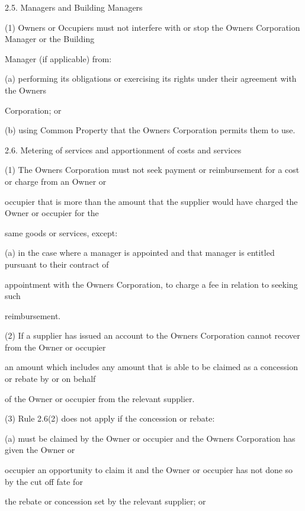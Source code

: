 \documentclass{article}
\begin{document}
{\fontsize{9.99}{1}2.5. Managers and Building Managers }

{\fontsize{9.962}{1}(1) Owners or Occupiers must not interfere with or stop the Owners Corporation Manager or the Building }

{\fontsize{10.02}{1}Manager (if applicable) from: }

{\fontsize{9.962}{1}(a) performing its obligations or exercising its rights under their agreement with the Owners }

{\fontsize{10.02}{1}Corporation; or }

{\fontsize{9.962}{1}(b) using Common Property that the Owners Corporation permits them to use. }

{\fontsize{9.99}{1}2.6. Metering of services and apportionment of costs and services }

{\fontsize{9.962}{1}(1) The Owners Corporation must not seek payment or reimbursement for a cost or charge from an Owner or }

{\fontsize{10.02}{1}occupier that is more than the amount that the supplier would have charged the Owner or occupier for the }

{\fontsize{10.02}{1}same goods or services, except: }

{\fontsize{9.962}{1}(a) in the case where a manager is appointed and that manager is entitled pursuant to their contract of }

{\fontsize{10.02}{1}appointment with the Owners Corporation, to charge a fee in relation to seeking such }

{\fontsize{10.02}{1}reimbursement. }

{\fontsize{9.962}{1}(2) If a supplier has issued an account to the Owners Corporation cannot recover from the Owner or occupier }

{\fontsize{10.02}{1}an amount which includes any amount that is able to be claimed as a concession or rebate by or on behalf }

{\fontsize{10.02}{1}of the Owner or occupier from the relevant supplier. }

{\fontsize{9.962}{1}(3) Rule 2.6(2) does not apply if the concession or rebate: }

{\fontsize{9.962}{1}(a) must be claimed by the Owner or occupier and the Owners Corporation has given the Owner or }

{\fontsize{10.02}{1}occupier an opportunity to claim it and the Owner or occupier has not done so by the cut off fate for }

{\fontsize{10.02}{1}the rebate or concession set by the relevant supplier; or }
\end{document}
